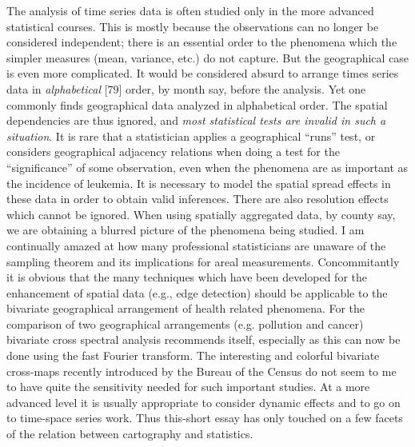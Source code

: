 \documentclass[a4paper,11pt]{article}
\begin{document}
The analysis of time series data is often studied only in the more advanced statistical courses. This is mostly because the observations can no longer be considered independent; there is an essential order to the phenomena which the simpler measures (mean, variance, etc.) do not capture. But the geographical case is even more complicated. It would be considered absurd to arrange times series data in \emph{alphabetical} [79] order, by month say, before the analysis. Yet one commonly finds geographical data analyzed in alphabetical order. The spatial dependencies are thus ignored, and \emph{most statistical tests are invalid in such a situation}. It is rare that a statistician applies a geographical ``runs'' test, or considers geographical adjacency relations when doing a test for the ``significance'' of some observation, even when the phenomena are as important as the incidence of leukemia. It is necessary to model the spatial spread effects in these data in order to obtain valid inferences. There are also resolution effects which cannot be ignored. When using spatially aggregated data, by county say, we are obtaining a blurred picture of the phenomena being studied. I am continually amazed at how many professional statisticians are unaware of the sampling theorem and its implications for areal measurements. Concommitantly it is obvious that the many techniques which have been developed for the enhancement of spatial data (e.g., edge detection) should be applicable to the bivariate geographical arrangement of health related phenomena. For the comparison of two geographical arrangements (e.g. pollution and cancer) bivariate cross spectral analysis recommends itself, especially as this can now be done using the fast Fourier transform. The interesting and colorful bivariate cross-maps recently introduced by the Bureau of the Census do not seem to me to have quite the sensitivity needed for such important studies. At a more advanced level it is usually appropriate to consider dynamic effects and to go on to time-space series work. Thus this-short essay has only touched on a few facets of the relation between cartography and statistics.

\bigskip
\end{document}

